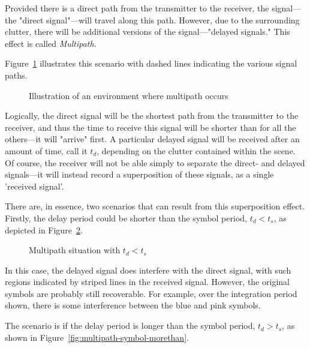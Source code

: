 \documentclass[class=report,11pt,crop=false]{standalone}
\begin{document}
Provided there is a direct path from the transmitter to the receiver, the signal---the "direct signal"---will travel along this path. However, due to the surrounding clutter, there will be additional versions of the signal---"delayed signals." This effect is called \emph{Multipath}.

Figure~\ref{fig:multipath-illustration} illustrates this scenario with dashed lines indicating the various signal paths.

\begin{figure}[htbp]
    \centering
    \captionsetup{type=figure}
    \def\svgwidth{\linewidth}
    { %
        }
    \caption{Illustration of an environment where multipath occurs}
    \label{fig:multipath-illustration}
\end{figure}

Logically, the direct signal will be the shortest path from the transmitter to the receiver, and thus the time to receive this signal will be shorter than for all the others---it will "arrive" first. A particular delayed signal will be received after an amount of time, call it \(t_d\), depending on the clutter contained within the scene. Of course, the receiver will not be able simply to separate the direct- and delayed signals---it will instead record a superposition of these signals, as a single 'received signal'.

There are, in essence, two scenarios that can result from this superposition effect. Firstly, the delay period could be shorter than the symbol period, \(t_d < t_s\), as depicted in Figure~\ref{fig:multipath-symbol-lessthan}.

\begin{figure}[htbp]
    \centering
    \captionsetup{type=figure}
    \def\svgwidth{\linewidth}
    { %
        }
    \caption{Multipath situation with \(t_d < t_s\)}
    \label{fig:multipath-symbol-lessthan}
\end{figure}

In this case, the delayed signal does interfere with the direct signal, with such regions indicated by striped lines in the received signal. However, the original symbols are probably still recoverable. For example, over the integration period shown, there is some interference between the blue and pink symbols.

The scenario is if the delay period is longer than the symbol period, \(t_d > t_s\), as shown in Figure~\ref{fig:multipath-symbol-morethan}.
\end{document}
